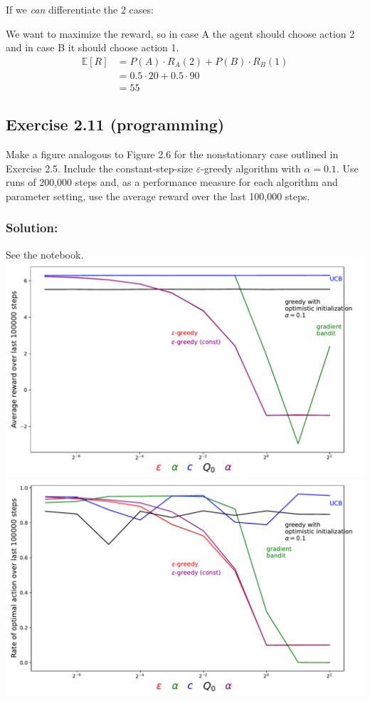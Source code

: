 If we \emph{can} differentiate the 2 cases:

We want to maximize the reward, so in case A the agent should choose action 2 and in case B it should choose action 1.   
\begin{equation}
    \begin{aligned}
    \mathbb{E}[R] &= P(A) \cdot R_A(2) + P(B) \cdot R_B(1) \\
        &= 0.5 \cdot 20 + 0.5 \cdot 90 \\
        &= 55
    \end{aligned}
\end{equation}


\subsection*{Exercise 2.11 (programming)}
Make a figure analogous to Figure 2.6 for the nonstationary
case outlined in Exercise 2.5. Include the constant-step-size $\varepsilon$-greedy algorithm with
$\alpha = 0.1$. Use runs of 200,000 steps and, as a performance measure for each algorithm and
parameter setting, use the average reward over the last 100,000 steps.

\subsubsection*{Solution:}

See the notebook. \\
\includegraphics[width=\textwidth, angle=0]{chapters_latex/figures/ex_02_11_reward.pdf}
\includegraphics[width=\textwidth, angle=0]{chapters_latex/figures/ex_02_11_rate.pdf}
